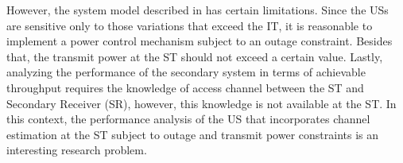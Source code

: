 \documentclass[letterpaper, twocolumn]{IEEEtran}
\begin{document}
However, the system model described in \cite{Kaushik15} has certain limitations. Since the USs are sensitive only to those variations that exceed the IT, it is reasonable to implement a power control mechanism subject to an outage constraint. Besides that, the transmit power at the ST should not exceed a certain value. Lastly, analyzing the performance of the secondary system in terms of achievable throughput requires the knowledge of access channel between the ST and Secondary Receiver (SR), however, this knowledge is not available at the ST. In this context, the performance analysis of the US that incorporates channel estimation at the ST subject to outage and transmit power constraints is an interesting research problem. %

\end{document}
